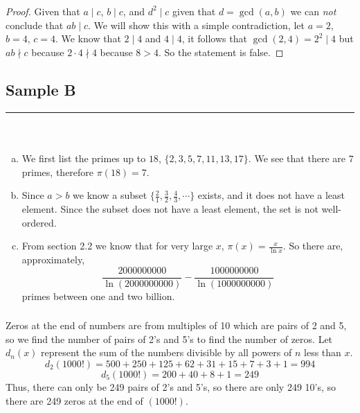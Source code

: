\documentclass[class=article, crop=false]{standalone}
\begin{document}
\subsubsection{}
\begin{proof}
	Given that $a\mid c$, $b\mid c$, and $d^2\mid c$ given that $d=\gcd(a,b)$ we can \emph{not} conclude
	that $ab\mid c$. We will show this with a simple contradiction, let $a=2$, $b=4$, $c=4$.
	We know that $2\mid 4$ and $4\mid 4$, it follows that $\gcd(2,4)=2^2\mid 4$ but 
	$ab\nmid c$ because $2\cdot 4\nmid 4$ because $8>4$. So the statement is false.
\end{proof}

\setcounter{subsection}{0}
\subsection{Sample B}
\rule{\textwidth}{1pt}\\
\subsubsection{}
\begin{enumerate}[(a)]
	\item
	We first list the primes up to $18$, $\{2,3,5,7,11,13,17\}$. We see that there are $7$ primes,
	therefore $\pi(18)=7$.
	
	\item
	Since $a>b$ we know a subset 
	$\{\frac{2}{1}, \frac{3}{2}, \frac{4}{3},\cdots\}$ exists, and it does not have a least element.
	Since the subset does not have a least element, the set is not well-ordered.
	
	\item
	From section 2.2 we know that for very large $x$, $\pi(x)=\frac{x}{\ln x}$.
	So there are, approximately, 
	$$\frac{2000000000}{\ln(2000000000)} - \frac{1000000000}{\ln(1000000000)}$$
	primes between one and two billion.

\end{enumerate}

\subsubsection{}
Zeros at the end of numbers are from multiples of 10 which are pairs of 2 and 5, so
we find the number of pairs of 2's and 5's to find the number of zeros. Let $d_n(x)$
represent the sum of the numbers divisible by all powers of $n$ less than $x$. 
$$d_2(1000!) = 500 + 250 + 125 + 62 + 31 + 15 + 7 + 3 + 1 = 994$$
$$d_5(1000!) = 200 + 40 + 8 + 1 = 249$$
Thus, there can only be 249 pairs of 2's and 5's, so there are only 249 
10's, so there are 249 zeros at the end of $(1000!)$.
\end{document}
